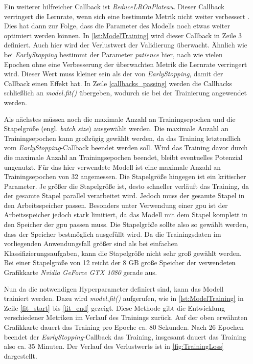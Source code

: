 Ein weiterer hilfreicher Callback ist \emph{ReduceLROnPlateau}.
Dieser Callback verringert die Lernrate, wenn sich eine bestimmte Metrik nicht weiter verbessert \cite{KerasReduceLROnPlateau}.
Dies hat dann zur Folge, dass die Parameter des Modells noch etwas weiter optimiert werden können.
In \autoref{lst:ModelTraining} wird dieser Callback in Zeile 3 definiert.
Auch hier wird der Verlustwert der Validierung überwacht.
Ähnlich wie bei \emph{EarlyStopping} bestimmt der Parameter \emph{patience} hier, nach wie vielen Epochen ohne eine Verbesserung der überwachten Metrik die Lernrate verringert wird.
Dieser Wert muss kleiner sein als der von \emph{EarlyStopping}, damit der Callback einen Effekt hat.
In Zeile \ref{callbacks_passing} werden die Callbacks schließlich an \emph{model.fit()} übergeben, wodurch sie bei der Trainierung angewendet werden.

Als nächstes müssen noch die maximale Anzahl an Trainingsepochen und die Stapelgröße (engl. \emph{batch size}) ausgewählt werden.
Die maximale Anzahl an Trainingsepochen kann großzügig gewählt werden, da das Training letztendlich vom \emph{EarlyStopping}-Callback beendet werden soll.
Wird das Training davor durch die maximale Anzahl an Trainingsepochen beendet, bleibt eventuelles Potenzial ungenutzt.
Für das hier verwendete Modell ist eine maximale Anzahl an Trainingsepochen von 32 angemessen.
Die Stapelgröße hingegen ist ein kritischer Parameter.
Je größer die Stapelgröße ist, desto schneller verläuft das Training, da der gesamte Stapel parallel verarbeitet wird.
Jedoch muss der gesamte Stapel in den Arbeitsspeicher passen.
Besonders unter Verwendung einer \acrshort{gpu} ist der Arbeitsspeicher jedoch stark limitiert, da das Modell mit dem Stapel komplett in den Speicher der \acrshort{gpu} passen muss.
Die Stapelgröße sollte also so gewählt werden, dass der Speicher bestmöglich ausgefüllt wird.
Da die Trainingsdaten im vorliegenden Anwendungsfall größer sind als bei einfachen Klassifizierungsaufgaben, kann die Stapelgröße nicht sehr groß gewählt werden.
Bei einer Stapelgröße von 12 reicht der 8 GB große Speicher der verwendeten Grafikkarte \emph{Nvidia GeForce GTX 1080} gerade aus.

Nun da die notwendigen Hyperparameter definiert sind, kann das Modell trainiert werden.
Dazu wird \emph{model.fit()} aufgerufen, wie in \autoref{lst:ModelTraining} in Zeile \ref{fit_start} bis \ref{fit_end} gezeigt.
Diese Methode gibt die Entwicklung verschiedener Metriken im Verlauf des Trainings zurück.
Auf der oben erwähnten Grafikkarte dauert das Training pro Epoche ca. 80 Sekunden.
Nach 26 Epochen beendet der \emph{EarlyStopping}-Callback das Training, insgesamt dauert das Training also ca. 35 Minuten.
Der Verlauf des Verlustwerts ist in \autoref{fig:TrainingLoss} dargestellt.

